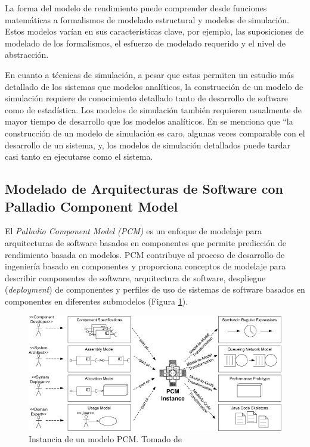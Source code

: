 \documentclass[conference]{IEEEtran}
\begin{document}
La forma del modelo de rendimiento puede comprender desde funciones matemáticas a formalismos de modelado estructural y modelos de simulación. Estos modelos varían en sus características clave, por ejemplo, las suposiciones de modelado de los formalismos, el esfuerzo de modelado requerido y el nivel de abstracción.

En cuanto a técnicas de simulación, a pesar que estas permiten un estudio más detallado de los sistemas que modelos analíticos, la construcción de un modelo de simulación requiere de conocimiento detallado tanto de desarrollo de software como de estadística\cite{thijmen-thesis}. Los modelos de simulación también requieren usualmente de mayor tiempo de desarrollo que los modelos analíticos. En \cite{woodside-et-al} se menciona que ``la construcción de un modelo de simulación es caro, algunas veces comparable con el desarrollo de un sistema, y, los modelos de simulación detallados puede tardar casi tanto en ejecutarse como el sistema.

\subsection{Modelado de Arquitecturas de Software con Palladio Component Model}
El \emph{Palladio Component Model (PCM)} es un enfoque de modelaje para arquitecturas de software basados en componentes que permite predicción de rendimiento basada en modelos. PCM contribuye al proceso de desarrollo de ingeniería basado en componentes y proporciona conceptos de modelaje para describir componentes de software, arquitectura de software, despliegue (\emph{deployment}) de componentes y perfiles de uso de sistemas de software basados en componentes en diferentes submodelos (Figura \ref{fig:pcm-instance}).

\begin{figure}[h]
  \centering
  \includegraphics[width=12cm]{palladio-cbse-process}
  \caption{\small{Instancia de un modelo PCM. Tomado de \cite{happe-et-al}}}
  \label{fig:pcm-instance}
\end{figure} 
\end{document}
